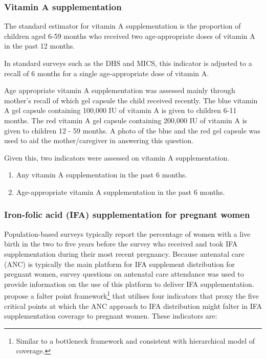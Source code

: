 \documentclass[12pt,a4paper]{article}
\let\rmarkdownfootnote\footnote%
\def\footnote{\protect\rmarkdownfootnote}
\begin{document}
\hypertarget{vitamin-a-supplementation}{%
\subsubsection{Vitamin A supplementation}\label{vitamin-a-supplementation}}

The standard estimator for vitamin A supplementation is the proportion of children aged 6-59 months who received two age-appropriate doses of vitamin A in the past 12 months.

In standard surveys such as the DHS and MICS, this indicator is adjusted to a recall of 6 months for a single age-appropriate dose of vitamin A.

Age appropriate vitamin A supplementation was assessed mainly through mother's recall of which gel capsule the child received recently. The blue vitamin A gel capsule containing 100,000 IU of vitamin A is given to children 6-11 months. The red vitamin A gel capsule containing 200,000 IU of vitamin A is given to children 12 - 59 months. A photo of the blue and the red gel capsule was used to aid the mother/caregiver in answering this question.

Given this, two indicators were assessed on vitamin A supplementation.

\begin{enumerate}
\def\labelenumi{\arabic{enumi}.}
\item
  Any vitamin A supplementation in the past 6 months.
\item
  Age-appropriate vitamin A supplementation in the past 6 months.
\end{enumerate}

\hypertarget{iron-folic-acid-ifa-supplementation-for-pregnant-women}{%
\subsubsection{Iron-folic acid (IFA) supplementation for pregnant women}\label{iron-folic-acid-ifa-supplementation-for-pregnant-women}}

Population-based surveys typically report the percentage of women with a live birth in the two to five years before the survey who received and took IFA supplementation during their most recent pregnancy. Because antenatal care (ANC) is typically the main platform for IFA supplement distribution for pregnant women, survey questions on antenatal care attendance was used to provide information on the use of this platform to deliver IFA supplementation. \citet{Sununtnasuk:2015kb} propose a falter point framework\footnote{Similar to a bottleneck framework and consistent with \citet{Tanahashi:1978we} hierarchical model of coverage.} that utilises four indicators that proxy the five critical points at which the ANC approach to IFA distribution might falter in IFA supplementation coverage to pregnant women. These indicators are:
\end{document}
